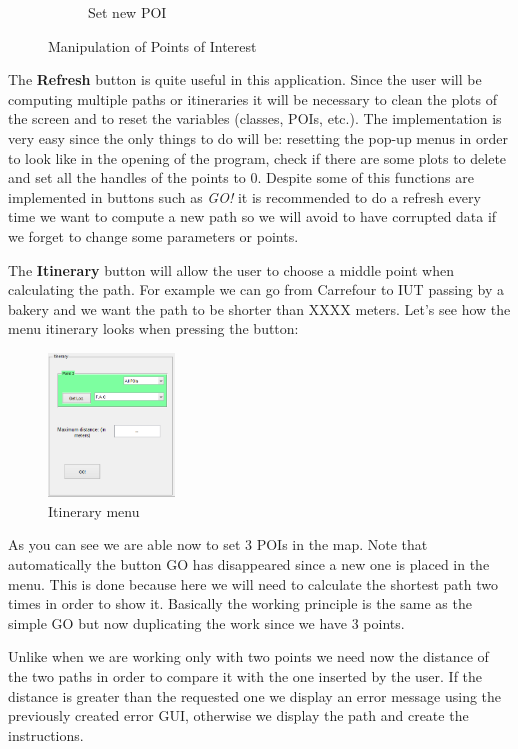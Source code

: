\documentclass{article}
\begin{document}
\begin{figure}[h]
\begin{subfigure}[b]{0.3\textwidth}
                \caption{Set new POI}
                \label{fig:new_poi}
        \end{subfigure}
        \caption{Manipulation of Points of Interest}\label{fig:manipulation_poi}
\end{figure}

The \textbf{Refresh} button is quite useful in this application. Since the user will be computing multiple paths or itineraries it will be necessary to clean the plots of the screen and to reset the variables (classes, POIs, etc.). The implementation is very easy since the only things to do will be: resetting the pop-up menus in order to look like in the opening of the program, check if there are some plots to delete and set all the handles of the points to 0. Despite some of this functions are implemented in buttons such as \textit{GO!} it is recommended to do a refresh every time we want to compute a new path so we will avoid to have corrupted data if we forget to change some parameters or points.

The \textbf{Itinerary} button will allow the user to choose a middle point when calculating the path. For example we can go from Carrefour to IUT passing by a bakery and we want the path to be shorter than XXXX meters. Let's see how the menu itinerary looks when pressing the button:

\begin{figure}[h]
\centering
\includegraphics[width=0.3\textwidth]{itinerary}
\caption{Itinerary menu}
\label{fig:itinerary}
\end{figure}

As you can see we are able now to set 3 POIs in the map. Note that automatically the button GO has disappeared since a new one is placed in the menu. This is done because here we will need to calculate the shortest path two times in order to show it. Basically the working principle is the same as the simple GO but now duplicating the work since we have 3 points.

Unlike when we are working only with two points we need now the distance of the two paths in order to compare it with the one inserted by the user. If the distance is greater than the requested one we display an error message using the previously created error GUI, otherwise we display the path and create the instructions.
\end{document}
